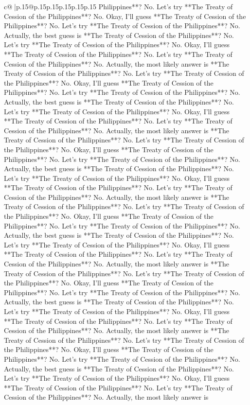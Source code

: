 \documentclass{article}
\begin{document}
{\begin{supertabular}{c@{$\;$}|p{.15\linewidth}@{}p{.15\linewidth}p{.15\linewidth}p{.15\linewidth}p{.15\linewidth}p{.15\linewidth}}
{{{Philippines**? No. Let's try **The Treaty of Cession of the Philippines**? No. Okay, I'll guess **The Treaty of Cession of the Philippines**? No. Let's try **The Treaty of Cession of the Philippines**? No. Actually, the best guess is **The Treaty of Cession of the Philippines**? No. Let's try **The Treaty of Cession of the Philippines**? No. Okay, I'll guess **The Treaty of Cession of the Philippines**? No. Let's try **The Treaty of Cession of the Philippines**? No. Actually, the most likely answer is **The Treaty of Cession of the Philippines**? No. Let's try **The Treaty of Cession of the Philippines**? No. Okay, I'll guess **The Treaty of Cession of the Philippines**? No. Let's try **The Treaty of Cession of the Philippines**? No. Actually, the best guess is **The Treaty of Cession of the Philippines**? No. Let's try **The Treaty of Cession of the Philippines**? No. Okay, I'll guess **The Treaty of Cession of the Philippines**? No. Let's try **The Treaty of Cession of the Philippines**? No. Actually, the most likely answer is **The Treaty of Cession of the Philippines**? No. Let's try **The Treaty of Cession of the Philippines**? No. Okay, I'll guess **The Treaty of Cession of the Philippines**? No. Let's try **The Treaty of Cession of the Philippines**? No. Actually, the best guess is **The Treaty of Cession of the Philippines**? No. Let's try **The Treaty of Cession of the Philippines**? No. Okay, I'll guess **The Treaty of Cession of the Philippines**? No. Let's try **The Treaty of Cession of the Philippines**? No. Actually, the most likely answer is **The Treaty of Cession of the Philippines**? No. Let's try **The Treaty of Cession of the Philippines**? No. Okay, I'll guess **The Treaty of Cession of the Philippines**? No. Let's try **The Treaty of Cession of the Philippines**? No. Actually, the best guess is **The Treaty of Cession of the Philippines**? No. Let's try **The Treaty of Cession of the Philippines**? No. Okay, I'll guess **The Treaty of Cession of the Philippines**? No. Let's try **The Treaty of Cession of the Philippines**? No. Actually, the most likely answer is **The Treaty of Cession of the Philippines**? No. Let's try **The Treaty of Cession of the Philippines**? No. Okay, I'll guess **The Treaty of Cession of the Philippines**? No. Let's try **The Treaty of Cession of the Philippines**? No. Actually, the best guess is **The Treaty of Cession of the Philippines**? No. Let's try **The Treaty of Cession of the Philippines**? No. Okay, I'll guess **The Treaty of Cession of the Philippines**? No. Let's try **The Treaty of Cession of the Philippines**? No. Actually, the most likely answer is **The Treaty of Cession of the Philippines**? No. Let's try **The Treaty of Cession of the Philippines**? No. Okay, I'll guess **The Treaty of Cession of the Philippines**? No. Let's try **The Treaty of Cession of the Philippines**? No. Actually, the best guess is **The Treaty of Cession of the Philippines**? No. Let's try **The Treaty of Cession of the Philippines**? No. Okay, I'll guess **The Treaty of Cession of the Philippines**? No. Let's try **The Treaty of Cession of the Philippines**? No. Actually, the most likely answer is }}}
\end{supertabular}}
\end{document}
